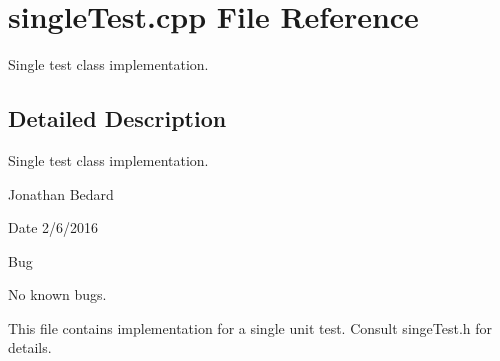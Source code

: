 \section{single\+Test.\+cpp File Reference}
\label{singleTest_8cpp}


Single test class implementation.  




\subsection{Detailed Description}
Single test class implementation. 

Jonathan Bedard \begin{DoxyDate}{Date}
2/6/2016 
\end{DoxyDate}
\begin{DoxyRefDesc}{Bug}
\item[{\bf Bug}]No known bugs.\end{DoxyRefDesc}


This file contains implementation for a single unit test. Consult singe\+Test.\+h for details. 